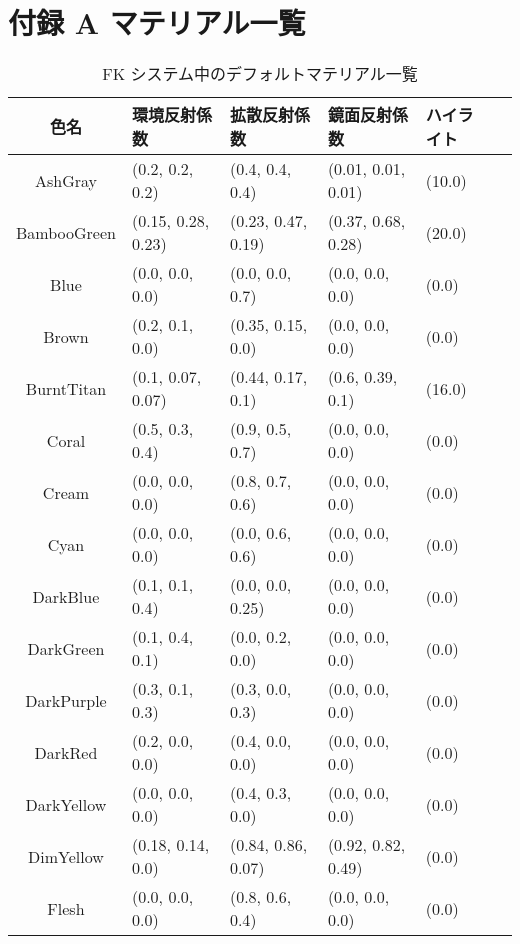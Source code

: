 \chapter*{付録 A マテリアル一覧}
\setcounter{chapter}{1}
\setcounter{table}{0}

\begin{table}[H]
\caption{FK システム中のデフォルトマテリアル一覧}
\label{tbl:MatTable}
\begin{small}
\begin{center}
\begin{tabular}{|c||l|l|l|l|l|}
\hline
色名 & 環境反射係数 & 拡散反射係数 &
		鏡面反射係数 & ハイライト \\ \hline \hline
AshGray & (0.2, 0.2, 0.2) & (0.4, 0.4, 0.4) & (0.01, 0.01, 0.01) & (10.0) \\ \hline
BambooGreen & (0.15, 0.28, 0.23) & (0.23, 0.47, 0.19) & (0.37, 0.68, 0.28) & (20.0) \\ \hline
Blue & (0.0, 0.0, 0.0) & (0.0, 0.0, 0.7) & (0.0, 0.0, 0.0) & (0.0) \\ \hline
Brown & (0.2, 0.1, 0.0) & (0.35, 0.15, 0.0) & (0.0, 0.0, 0.0) & (0.0) \\ \hline
BurntTitan & (0.1, 0.07, 0.07) & (0.44, 0.17, 0.1) & (0.6, 0.39, 0.1) & (16.0) \\ \hline
Coral & (0.5, 0.3, 0.4) & (0.9, 0.5, 0.7) & (0.0, 0.0, 0.0) & (0.0) \\ \hline
Cream & (0.0, 0.0, 0.0) & (0.8, 0.7, 0.6) & (0.0, 0.0, 0.0) & (0.0) \\ \hline
Cyan & (0.0, 0.0, 0.0) & (0.0, 0.6, 0.6) & (0.0, 0.0, 0.0) & (0.0) \\ \hline
DarkBlue & (0.1, 0.1, 0.4) & (0.0, 0.0, 0.25) & (0.0, 0.0, 0.0) & (0.0) \\ \hline
DarkGreen & (0.1, 0.4, 0.1) & (0.0, 0.2, 0.0) & (0.0, 0.0, 0.0) & (0.0) \\ \hline
DarkPurple & (0.3, 0.1, 0.3) & (0.3, 0.0, 0.3) & (0.0, 0.0, 0.0) & (0.0) \\ \hline
DarkRed & (0.2, 0.0, 0.0) & (0.4, 0.0, 0.0) & (0.0, 0.0, 0.0) & (0.0) \\ \hline
DarkYellow & (0.0, 0.0, 0.0) & (0.4, 0.3, 0.0) & (0.0, 0.0, 0.0) & (0.0) \\ \hline
DimYellow & (0.18, 0.14, 0.0) & (0.84, 0.86, 0.07) & (0.92, 0.82, 0.49) & (0.0) \\ \hline
Flesh & (0.0, 0.0, 0.0) & (0.8, 0.6, 0.4) & (0.0, 0.0, 0.0) & (0.0) \\ \hline

\end{tabular}
\end{center}
\end{small}
\end{table}
